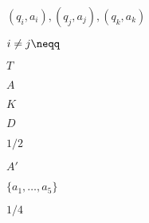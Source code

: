 \documentclass[10pt]{book}
\begin{document}
\begin{mdSnippets}
\begin{mdInlineSnippet}[d133b6608de3a6748dc3bb40219694e9]
$(q_i, a_i), (q_j,a_j), (q_k,a_k)$\end{mdInlineSnippet}%
\begin{mdInlineSnippet}[482d6a4fc96e036f7cb916067463d5bb]%
$i \neq j \neqq$\end{mdInlineSnippet}%
\begin{mdInlineSnippet}%
$T$\end{mdInlineSnippet}%
\begin{mdInlineSnippet}[7fc56270e7a70fa81a5935b72eacbe29]%
$A$\end{mdInlineSnippet}%
\begin{mdInlineSnippet}[a5f3c6a11b03839d46af9fb43c97c188]%
$K$\end{mdInlineSnippet}%
\begin{mdInlineSnippet}[f623e75af30e62bbd73d6df5b50bb7b5]%
$D$\end{mdInlineSnippet}%
\begin{mdInlineSnippet}[975ca8804565c1a569450d61090b2743]%
$1/2$\end{mdInlineSnippet}%
\begin{mdInlineSnippet}[37a12b78a9ca96989ad7ceceacb37ea2]%
$A'$\end{mdInlineSnippet}%
\begin{mdInlineSnippet}[97a983d484676fa636c525b229ba0b03]%
$\{ a_1,\ldots, a_5 \}$\end{mdInlineSnippet}%
\begin{mdInlineSnippet}[ff8bed43ac09b1148fc7648f5845f698]%
$1/4$\end{mdInlineSnippet}%

\end{mdSnippets}
\end{document}
